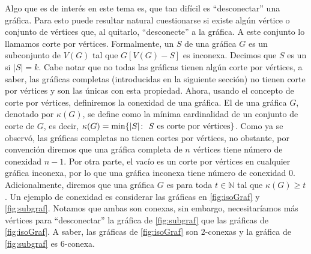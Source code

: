 Algo que es de inter\'es en este tema es, que tan dif\'icil es ``desconectar''
una gr\'afica. Para esto puede resultar natural cuestionarse si existe alg\'un
v\'ertice o conjunto de v\'ertices que, al quitarlo, ``desconecte'' a la
gr\'afica. A este conjunto lo llamamos corte por v\'ertices. Formalmente, un
 $S$ de una gr\'afica $G$ es un subconjunto de
$V(G)$ tal que $G[V(G)-S]$ es inconexa. Decimos que $S$ es un  si $|S|=k$. Cabe notar que no todas las gr\'aficas tienen
alg\'un corte por v\'ertices, a saber, las gr\'aficas completas (introducidas en
la siguiente secci\'on) no tienen corte por v\'ertices y son las \'unicas con
esta propiedad. Ahora, usando el concepto de corte por v\'ertices, definiremos
la conexidad de una gr\'afica. El  de una
gr\'afica $G$, denotado por $\kappa(G)$, se define como la m\'inima cardinalidad
de un conjunto de corte de $G$, es decir, $\kappa(G)=\min \{|S| \colon\ S
\textnormal{ es corte por v\'ertices}\}$. Como ya se observ\'o, las gr\'aficas
completas no tienen cortes por v\'ertices, no obstante, por convenci\'on diremos
que una gr\'afica completa de $n$ v\'ertices tiene n\'umero de conexidad $n-1$.
Por otra parte, el vac\'io es un corte por v\'ertices en cualquier gr\'afica
inconexa, por lo que una gr\'afica inconexa tiene n\'umero de conexidad $0$.
Adicionalmente, diremos que una gr\'afica $G$ es
 para toda $t \in \mathbb{N}$ tal que
$\kappa(G)\geq t$. Un ejemplo de conexidad es considerar las gr\'aficas en
\cref{fig:isoGraf} y \cref{fig:subgraf}. Notamos que ambas son conexas, sin
embargo, necesitar\'iamos m\'as v\'ertices para ``desconectar'' la gr\'afica de
\cref{fig:subgraf} que las gr\'aficas de \cref{fig:isoGraf}. A saber, las
gr\'aficas de \cref*{fig:isoGraf} son $2$-conexas y la gr\'afica de
\cref{fig:subgraf} es $6$-conexa.

